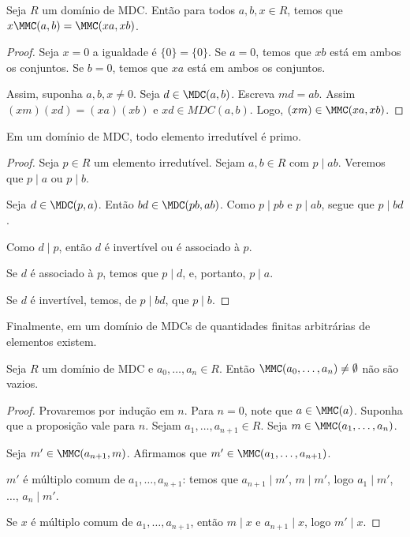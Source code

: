 \begin{corol}
    Seja $R$ um domínio de MDC.
    Então para todos $a, b, x \in R$, temos que $x\MMC(a, b)=\MMC(xa, xb)$.
\end{corol}
\begin{proof}
Seja $x=0$ a igualdade é $\{0\}=\{0\}$.
Se $a=0$, temos que $xb$ está em ambos os conjuntos.
Se $b=0$, temos que $xa$ está em ambos os conjuntos.

Assim, suponha $a, b, x \neq 0$.
Seja $d\in \MDC(a, b)$.
Escreva $md=ab$.
Assim $(xm)(xd)=(xa)(xb)$ e $xd \in MDC(a, b)$.
Logo, $(xm)\in \MMC(xa, xb)$.
\end{proof}

\begin{lemma}
    Em um domínio de MDC, todo elemento irredutível é primo.
    \end{lemma}
    
\begin{proof}
    Seja $p \in R$ um elemento irredutível.
    Sejam $a, b \in R$ com $p\mid ab$.
    Veremos que $p\mid a$ ou $p\mid b$.

    Seja $d\in\MDC(p, a)$.
    Então $bd\in \MDC(pb, ab)$.
    Como $p\mid pb$ e $p\mid ab$, segue que $p\mid bd$.

    Como $d\mid p$, então $d$ é invertível ou é associado à $p$.

    Se $d$ é associado à $p$, temos que $p\mid d$, e, portanto, $p\mid a$.

    Se $d$ é invertível, temos, de $p\mid bd$, que $p\mid b$.
\end{proof}

Finalmente, em um domínio de MDCs de quantidades finitas arbitrárias de elementos existem.

\begin{prop}
    Seja $R$ um domínio de MDC e $a_0, \dots, a_n \in R$.
    Então $\MMC(a_0, \dots, a_n)\neq \emptyset$ não são vazios.
\end{prop}

\begin{proof}
Provaremos por indução em $n$.
Para $n=0$, note que $a \in \MMC(a)$.
Suponha que a proposição vale para $n$. Sejam $a_1, \dots, a_{n+1} \in R$.
Seja $m\in \MMC(a_1, \dots, a_n)$.

Seja $m' \in \MMC(a_{n+1}, m)$.
Afirmamos que $m'\in \MMC(a_1, \dots, a_{n+1})$.

$m'$ é múltiplo comum de $a_1, \dots, a_{n+1}$: temos que $a_{n+1}\mid m'$, $m\mid m'$, logo $a_1\mid m'$, $\dots$, $a_n\mid m'$.

Se $x$ é múltiplo comum de $a_1, \dots, a_{n+1}$, então $m\mid x$ e $a_{n+1}\mid x$, logo $m'\mid x$.
\end{proof}
